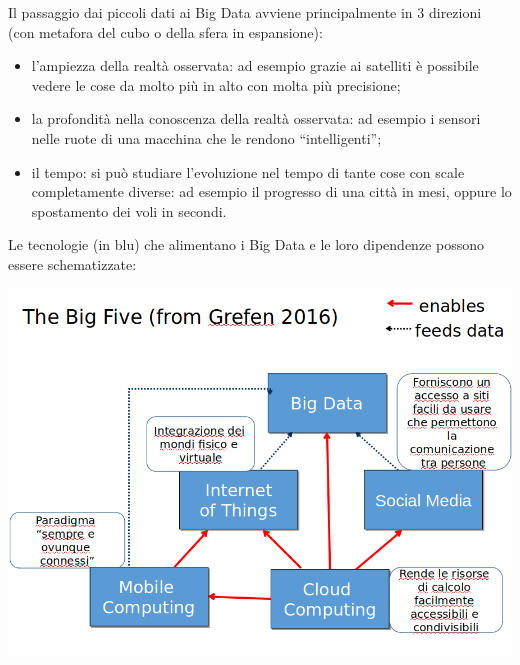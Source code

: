 \documentclass[a4page, 11pt]{article}
\begin{document}
Il passaggio dai piccoli dati ai Big Data avviene principalmente in 3 direzioni (con metafora del cubo o della sfera in espansione):
\begin{itemize}
  \item l'ampiezza della realtà osservata: ad esempio grazie ai satelliti è possibile vedere le cose da molto più in alto con molta più precisione;
  \item la profondità nella conoscenza della realtà osservata: ad esempio i sensori nelle ruote di una macchina che le rendono ``intelligenti'';
  \item il tempo: si può studiare l'evoluzione nel tempo di tante cose con scale completamente diverse: ad esempio il progresso di una città in 	mesi, oppure lo spostamento dei voli in secondi.
\end{itemize}
Le tecnologie (in blu) che alimentano i Big Data e le loro dipendenze possono essere schematizzate:
\begin{center}
	\includegraphics[scale=0.4]{image7.png}
\end{center}
\end{document}
